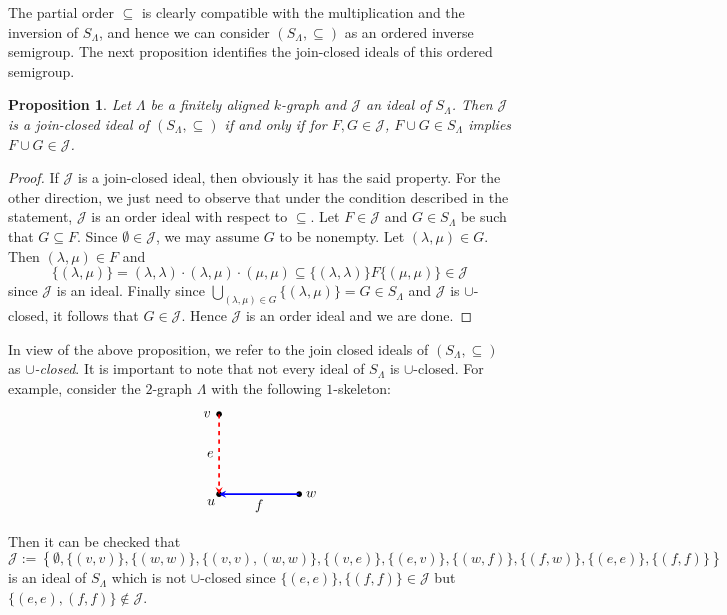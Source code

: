 \documentclass[a4paper,reqno,11pt]{amsart}
\numberwithin{equation}{section}
\newtheorem{prop}[thm]{Proposition}
\theoremstyle{definition}
\theoremstyle{remark}
\begin{document}
The partial order $\subseteq$ is clearly compatible with the multiplication and the inversion of $S_\Lambda$, and hence we can consider $(S_\Lambda,\subseteq)$ as an ordered inverse semigroup. The next proposition identifies the join-closed ideals of this ordered semigroup. 

\begin{prop}\label{pro u-closed ideals are join closed}
Let $\Lambda$ be a finitely aligned $k$-graph and $\mathcal{J}$ an ideal of $S_\Lambda$. Then $\mathcal{J}$ is a join-closed ideal of $(S_\Lambda,\subseteq)$ if and only if for $F,G\in \mathcal{J}$, $F\cup G\in S_\Lambda$ implies $F\cup G\in \mathcal{J}$.    
\end{prop}
\begin{proof}
If $\mathcal{J}$ is a join-closed ideal, then obviously it has the said property. For the other direction, we just need to observe that under the condition described in the statement, $\mathcal{J}$ is an order ideal with respect to $\subseteq$. Let $F\in \mathcal{J}$ and $G\in S_\Lambda$ be such that $G\subseteq F$. Since $\emptyset\in \mathcal{J}$, we may assume $G$ to be nonempty. Let $(\lambda,\mu)\in G$. Then $(\lambda,\mu)\in F$ and \[\{(\lambda,\mu)\}=(\lambda,\lambda)\cdot (\lambda,\mu)\cdot (\mu,\mu)\subseteq \{(\lambda,\lambda)\}F\{(\mu,\mu)\}\in \mathcal{J}\] since $\mathcal{J}$ is an ideal. Finally since $\displaystyle{\bigcup_{(\lambda,\mu)\in G}} \{(\lambda,\mu)\}=G\in S_\Lambda$ and $\mathcal{J}$ is $\cup$-closed, it follows that $G\in \mathcal{J}$. Hence $\mathcal{J}$ is an order ideal and we are done.  
\end{proof}

In view of the above proposition, we refer to the join closed ideals of $(S_\Lambda,\subseteq)$ as \emph{$\cup$-closed}. It is important to note that not every ideal of $S_\Lambda$ is $\cup$-closed. For example, consider the $2$-graph $\Lambda$ with the following $1$-skeleton: 
\[
\begin{tikzpicture}[>=stealth, line width=1.2pt]

    \fill (0,0) circle (2pt);
    \fill (0,-2) circle (2pt);
    \fill (2,-2) circle (2pt);

    \draw[->, blue] (2,-2) -- node[below] {\textcolor{black}{$f$}} (0,-2);

    \draw[->, dashed, red, line width=1.2pt]
        (0,0) -- node[left] {\textcolor{black}{$e$}} (0,-2);

    \node[] (a) at (-0.3,0) {$v$};
    \node[] (b) at (-0.2,-2.2) {$u$};
    \node[] (c) at (2.3,-2) {$w$};

\end{tikzpicture}
\]
Then it can be checked that \[\mathcal{J}:=\left\{\emptyset,\{(v,v)\},\{(w,w)\},\{(v,v),(w,w)\},\{(v,e)\},\{(e,v)\},\{(w,f)\}, \{(f,w)\},\{(e,e)\},\{(f,f)\}\right\}\] is an ideal of $S_\Lambda$ which is not $\cup$-closed since $\{(e,e)\}, \{(f,f)\}\in \mathcal{J}$ but $\{(e,e),(f,f)\}\notin \mathcal{J}$.
\end{document}
